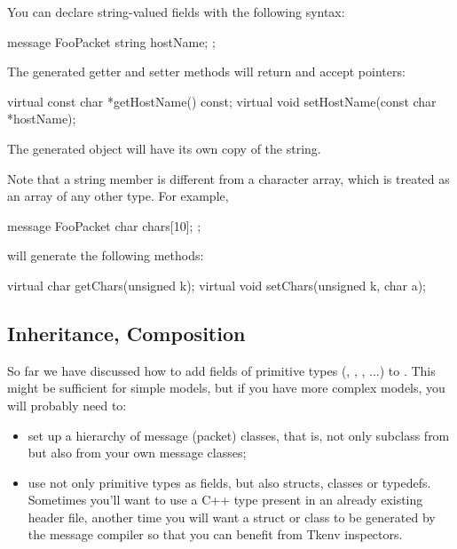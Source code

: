 You can declare string-valued fields with the following syntax:

\begin{msg}
message FooPacket
{
    string hostName;
};
\end{msg}

The generated getter and setter methods will return and accept 
pointers:

\begin{cpp}
virtual const char *getHostName() const;
virtual void setHostName(const char *hostName);
\end{cpp}

The generated object will have its own copy of the string.

Note that a string member is different from a character array,
which is treated as an array of any other type. For example,

\begin{msg}
message FooPacket
{
    char chars[10];
};
\end{msg}

will generate the following methods:

\begin{cpp}
virtual char getChars(unsigned k);
virtual void setChars(unsigned k, char a);
\end{cpp}


\subsection{Inheritance, Composition}

So far we have discussed how to add fields of primitive types
(, , , ...) to
. This might be sufficient for simple models, but if you
have more complex models, you will probably need to:

\begin{itemize}
  \item set up a hierarchy of message (packet) classes, that is,
    not only subclass from  but also from your
    own message classes;
  \item use not only primitive types as fields, but also structs,
    classes or typedefs. Sometimes you'll want to use a C++ type
    present in an already existing header file, another time you will
    want a struct or class to be generated by the message
    compiler so that you can benefit from Tkenv inspectors.
\end{itemize}

